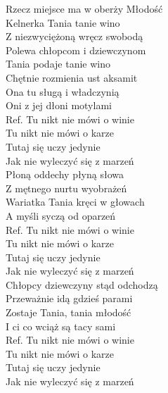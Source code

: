 
Rzecz miejsce ma w oberży Młodość \\
Kelnerka Tania tanie wino \\
Z niezwyciężoną wręcz swobodą \\
Polewa chłopcom i dziewczynom \\
\hops
Tania podaje tanie wino \\
Chętnie rozmienia ust aksamit \\
Ona tu sługą i władczynią \\
Oni z jej dłoni motylami \\
\hops
Ref. Tu nikt nie mówi o winie\\
 Tu nikt nie mówi o karze \\
 Tutaj się uczy jedynie \\
 Jak nie wyleczyć się z marzeń \\
\hops
Płoną oddechy płyną słowa \\
Z mętnego nurtu wyobrażeń \\
Wariatka Tania kręci w głowach \\
A myśli syczą od oparzeń \\
\hops
Ref. Tu nikt nie mówi o winie\\
 Tu nikt nie mówi o karze \\
 Tutaj się uczy jedynie \\
 Jak nie wyleczyć się z marzeń \\
\hops
Chłopcy dziewczyny stąd odchodzą \\
Przeważnie idą gdzieś parami \\
Zostaje Tania, tania młodość \\
I ci co wciąż są tacy sami \\
\hops
Ref. Tu nikt nie mówi o winie\\
 Tu nikt nie mówi o karze \\
 Tutaj się uczy jedynie \\
 Jak nie wyleczyć się z marzeń